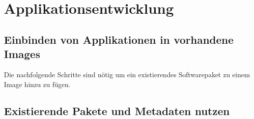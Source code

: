 \chapter{Applikationsentwicklung}
\label{chap:applikationsentwicklung}

\section{Einbinden von Applikationen in vorhandene Images}%
\label{sec:einbinden_von_applikationen_in_vorhandene_images}

Die nachfolgende Schritte sind nötig um ein existierendes Softwarepaket zu einem
Image hinzu zu fügen.

\section{Existierende Pakete und Metadaten nutzen}%
\label{sec:existirende_pakete_und_metadaten}

